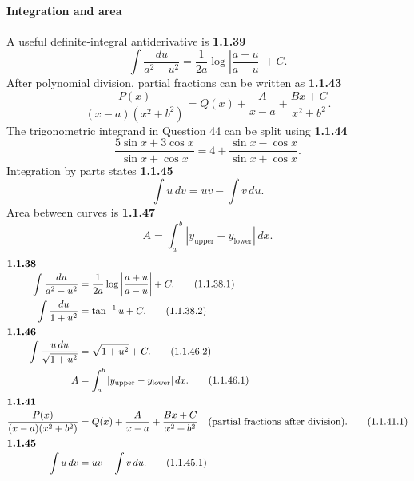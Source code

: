 \paragraph*{Integration and area}
A useful definite-integral antiderivative is
\noindent\textbf{1.1.39}\quad
\begin{equation}
\int\frac{du}{a^2-u^2}=\frac1{2a}\log\left|\frac{a+u}{a-u}\right|+C.\tag{1.1.39.1}\label{eq:int-rational-39}
\end{equation}
After polynomial division, partial fractions can be written as
\noindent\textbf{1.1.43}\quad
\begin{equation}
\frac{P(x)}{(x-a)(x^2+b^2)}=Q(x)+\frac{A}{x-a}+\frac{Bx+C}{x^2+b^2}.\tag{1.1.43.1}\label{eq:partial-fractions-43}
\end{equation}
The trigonometric integrand in Question 44 can be split using
\noindent\textbf{1.1.44}\quad
\begin{equation}
\frac{5\sin x+3\cos x}{\sin x+\cos x}=4+\frac{\sin x-\cos x}{\sin x+\cos x}.\tag{1.1.44.1}\label{eq:trig-split-44}
\end{equation}
Integration by parts states
\noindent\textbf{1.1.45}\quad
\begin{equation}
\int u\,dv=uv-\int v\,du.\tag{1.1.45.2}\label{eq:parts-45-2}
\end{equation}
Area between curves is
\noindent\textbf{1.1.47}\quad
\begin{equation}
A=\int_a^b|y_{\mathrm{upper}}-y_{\mathrm{lower}}|\,dx.\tag{1.1.47.1}\label{eq:area-between-47}
\end{equation}
\begin{align}\intertext{\textbf{1.1.38}}
\int\frac{du}{a^2-u^2}&=\frac1{2a}\log\left|\frac{a+u}{a-u}\right|+C. \tag{1.1.38.1}\\
\int\frac{du}{1+u^2}&=\tan^{-1}u+C. \tag{1.1.38.2}\\
\intertext{\textbf{1.1.46}}
\int\frac{u\,du}{\sqrt{1+u^2}}&=\sqrt{1+u^2}+C. \tag{1.1.46.2}\\
A&=\int_a^b |y_{\mathrm{upper}}-y_{\mathrm{lower}}|\,dx. \tag{1.1.46.1}\\
\intertext{\textbf{1.1.41}}
\frac{P(x)}{(x-a)(x^2+b^2)}&=Q(x)+\frac{A}{x-a}+\frac{Bx+C}{x^2+b^2}\quad\text{(partial fractions after division)}. \tag{1.1.41.1}\\
\intertext{\textbf{1.1.45}}
\int u\,dv&=uv-\int v\,du. \tag{1.1.45.1}
\end{align}

